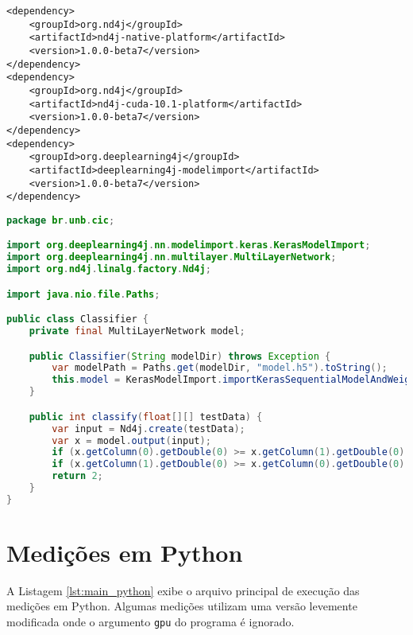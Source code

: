 \begin{lstlisting}[caption=Dependências Maven para uso de Deeplearning4j com GPU]
<dependency>
    <groupId>org.nd4j</groupId>
    <artifactId>nd4j-native-platform</artifactId>
    <version>1.0.0-beta7</version>
</dependency>
<dependency>
    <groupId>org.nd4j</groupId>
    <artifactId>nd4j-cuda-10.1-platform</artifactId>
    <version>1.0.0-beta7</version>
</dependency>
<dependency>
    <groupId>org.deeplearning4j</groupId>
    <artifactId>deeplearning4j-modelimport</artifactId>
    <version>1.0.0-beta7</version>
</dependency>
\end{lstlisting}

\begin{lstlisting}[language=Java, caption=Classificador implementado em Java utilizando Deeplearning4j]
package br.unb.cic;

import org.deeplearning4j.nn.modelimport.keras.KerasModelImport;
import org.deeplearning4j.nn.multilayer.MultiLayerNetwork;
import org.nd4j.linalg.factory.Nd4j;

import java.nio.file.Paths;

public class Classifier {
    private final MultiLayerNetwork model;

    public Classifier(String modelDir) throws Exception {
        var modelPath = Paths.get(modelDir, "model.h5").toString();
        this.model = KerasModelImport.importKerasSequentialModelAndWeights(modelPath);
    }

    public int classify(float[][] testData) {
        var input = Nd4j.create(testData);
        var x = model.output(input);
        if (x.getColumn(0).getDouble(0) >= x.getColumn(1).getDouble(0) && x.getColumn(0).getDouble(0) >= x.getColumn(2).getDouble(0)) return 0;
        if (x.getColumn(1).getDouble(0) >= x.getColumn(0).getDouble(0) && x.getColumn(1).getDouble(0) >= x.getColumn(2).getDouble(0)) return 1;
        return 2;
    }
}
\end{lstlisting}

\section{Medições em Python}

A Listagem \ref{lst:main_python} exibe o arquivo principal de execução das medições em Python. Algumas medições utilizam uma versão levemente modificada onde o argumento \texttt{gpu} do programa é ignorado.

